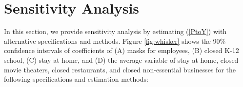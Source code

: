 \documentclass[11pt,reqno,letter]{amsart}
\theoremstyle{definition}
\begin{document}


\maketitle




\section{Sensitivity Analysis}


In this section, we provide sensitivity analysis by estimating (\ref{PtoY}) with alternative specifications and methods. Figure \ref{fig:whisker} shows  the 90\% confidence intervals of   coefficients of (A) masks for employees, (B)  closed K-12 school, (C) stay-at-home, and (D) the average variable of stay-at-home, closed movie theaters, closed restaurants, and closed non-essential businesses for the following specifications and estimation methods:
\end{document}

